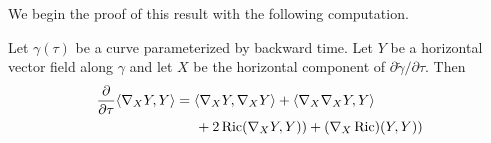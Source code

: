 We begin the proof of this result with the following computation.

\begin{claim}\label{claim:covariant-derivative-inner-product-formula}

  Let
$\gamma(\tau)$ be a curve parameterized by backward time. Let $Y$ be
a horizontal vector field along $\gamma$ and let $X$ be the
horizontal component of $\partial\widetilde\gamma/\partial \tau$.
Then
\begin{align*}\frac{\partial}{\partial\tau}\langle \nabla_{ X}Y, Y\rangle
 &= \langle \nabla_{ X} Y, \nabla_{ X} Y\rangle  + \langle
\nabla_{ X}\nabla_{ X} Y, Y\rangle
\\&\hspace{0.5cm} +2\operatorname{Ric}(\nabla_XY,Y)) +(\nabla_X\operatorname{Ric})(Y,Y))\end{align*}
\end{claim}

